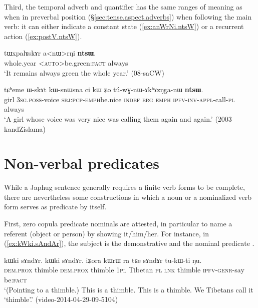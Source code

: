 Third, the temporal adverb and quantifier  has the same ranges of meaning as when in preverbal position (§\ref{sec:tense.aspect.adverbs})  when following the main verb: it can either indicate a constant state (\ref{ex:anWrNi.ntsW}) or a recurrent action (\ref{ex:postV.ntsW}).

\begin{exe}
\ex \label{ex:anWrNi.ntsW}
\gll tɯxpalɤskɤr a<nɯ>rŋi \textbf{ntsɯ}. \\
whole.year <\textsc{auto}>be.green:\textsc{fact} always \\
\glt `It remains always green the whole year.' (08-saCW)
\end{exe}

\begin{exe}
\ex \label{ex:postV.ntsW}
\gll  tɕʰeme ɯ-skɤt kɯ-snɯ\redp{}sna ci kɯ ʑo tú-wɣ-nɯ-ɤkʰɤzŋga-nɯ \textbf{ntsɯ}. \\
girl \textsc{3sg}.\textsc{poss}-voice \textsc{sbj}:\textsc{pcp}-\textsc{emph}\redp{}be.nice \textsc{indef} \textsc{erg} \textsc{emph} \textsc{ipfv}-\textsc{inv}-\textsc{appl}-call-\textsc{pl} always \\
\glt `A girl whose voice was very nice was calling them again and again.' (2003 kandZislama)
\end{exe}

 
\section{Non-verbal predicates} \label{sec:non.verbal.predicates}
 
While a Japhug sentence generally requires a finite verb forms to be complete, there are nevertheless some constructions in which a noun or a nominalized verb form serves as predicate by itself.

First, zero copula predicate nominals are attested, in particular to name a referent (object or person) by showing it/him/her. For instance, in (\ref{ex:kWki.sAndAr}), the subject is the demonstrative  and the nominal predicate . 
 
\begin{exe}
\ex \label{ex:kWki.sAndAr}
\gll kɯki sɤndɤr. kɯki sɤndɤr. iʑora kɯrɯ ra tɕe sɤndɤr tu-kɯ-ti ŋu. \\
\textsc{dem}.\textsc{prox} thimble  \textsc{dem}.\textsc{prox} thimble \textsc{1pl} Tibetan \textsc{pl} \textsc{lnk} thimble \textsc{ipfv}-\textsc{genr}-say be:\textsc{fact} \\
\glt `(Pointing to a thimble.) This is a thimble. This is a thimble. We Tibetans call it `thimble'.' (video-2014-04-29-09-5104)
\end{exe}

